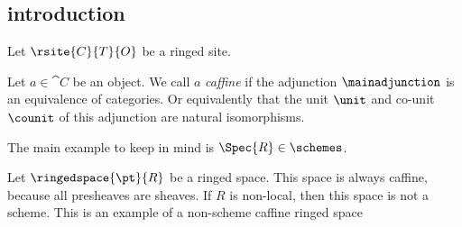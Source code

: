 \subsection{introduction}

Let $\rsite{C}{T}{O}$ be a ringed site.

\begin{definition}[Caffine]
Let $a\in \cat{C}$ be an object. 
We call $a$ \emph{caffine} if the adjunction $\mainadjunction$ is an equivalence of categories. 
Or equivalently that the unit $\unit$ and co-unit $\counit$ of this adjunction are natural isomorphisms.
\end{definition}

\begin{example}
The main example to keep in mind is $\Spec{R} \in \schemes$.



Let $\ringedspace{\pt}{R}$ be a ringed space. This space is always caffine, because all presheaves are sheaves.
If $R$ is non-local, then this space is not a scheme. This is an example of a non-scheme caffine ringed space
\end{example}